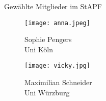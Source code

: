 \documentclass[compress, aspectratio=169]{beamer}
\begin{document}
\begin{frame}{Gewählte Mitglieder im StAPF}
  \vspace{1cm}
  \hspace{0.1\textwidth}
   \begin{minipage}{.28\textwidth}
    \begin{figure}
      \begin{minipage}[c]{.57\textwidth}
        \texttt{[image: anna.jpeg]}
      \end{minipage} \hfill
      \begin{minipage}[c]{.4\textwidth}
        \caption*{Sophie Pengers \\Uni Köln}
      \end{minipage}
    \end{figure}
  \end{minipage}
  \hspace{0.1\textwidth}
  \begin{minipage}{.28\textwidth}
    \begin{figure}
      \begin{minipage}[c]{.57\textwidth}
        \texttt{[image: vicky.jpg]}
      \end{minipage} \hfill
      \begin{minipage}[c]{.4\textwidth}
        \caption*{Maximilian Schneider \\Uni Würzburg}
      \end{minipage}
    \end{figure}
  \end{minipage}
  \hspace{0.1\textwidth}

\end{frame}





\end{document}
